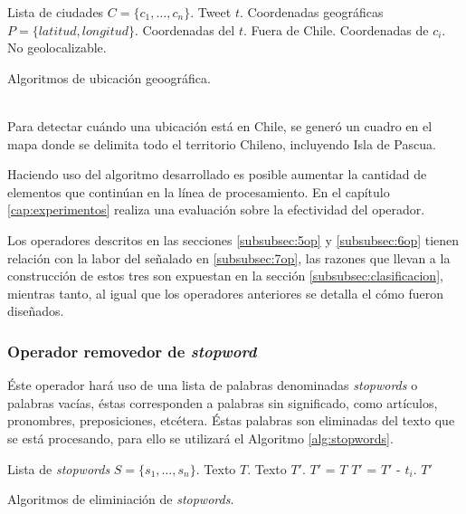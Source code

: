 \begin{algorithm}[H]
	\begin{algorithmic}
		\REQUIRE Lista de ciudades $C=\{c_{1}, \dots, c_{n} \}$.
		\REQUIRE Tweet $t$.
		\ENSURE Coordenadas geográficas $P=\{latitud, longitud\}$.
				\RETURN Coordenadas del $t$.
			\ELSE
				\RETURN Fuera de Chile.
			\ENDIF
		\ELSE
				\RETURN Coordenadas de $c_{i}$.
			\ELSE
				\RETURN No geolocalizable.
			\ENDIF
		\ENDIF
	\end{algorithmic}
	\caption{Algoritmos de ubicación geoográfica.}
	\label{alg:geolocalizacion}
\end{algorithm}\vphantom\\

Para detectar cuándo una ubicación está en Chile, se generó un cuadro en el mapa donde se delimita todo el territorio Chileno, incluyendo Isla de Pascua.

Haciendo uso del algoritmo desarrollado es posible aumentar la cantidad de elementos que continúan en la línea de procesamiento. En el capítulo \ref{cap:experimentos} realiza una evaluación sobre la efectividad del operador.

Los operadores descritos en las secciones \ref{subsubsec:5op} y \ref{subsubsec:6op} tienen relación con la labor del señalado en \ref{subsubsec:7op}, las razones que llevan a la construcción de estos tres son expuestan en la sección \ref{subsubsec:clasificacion}, mientras tanto, al igual que los operadores anteriores se detalla el cómo fueron diseñados.

\subsubsection*{Operador removedor de \textit{stopword}}
\label{subsubsec:5op}

Éste operador hará uso de una lista de palabras denominadas \textit{stopwords} o palabras vacías, éstas corresponden a palabras sin significado, como artículos, pronombres, preposiciones, etcétera. Éstas palabras son eliminadas del texto que se está procesando, para ello se utilizará el Algoritmo \ref{alg:stopwords}.\\

\begin{algorithm}[H]
	\begin{algorithmic}
		\REQUIRE Lista de \textit{stopwords} $S=\{s_{1}, \dots, s_{n} \}$.
		\REQUIRE Texto $T$.
		\ENSURE Texto $T'$.
		\STATE $T'$ = $T$
			\STATE $T'$ = $T'$ - $t_{i}$. 
			\ENDIF
		\ENDFOR
		\RETURN $T'$
	\end{algorithmic}
	\caption{Algoritmos de eliminiación de \textit{stopwords}.}
	\label{alg:stopwords}
\end{algorithm}\vphantom\\

